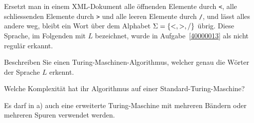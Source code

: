 Ersetzt man in einem XML-Dokument alle öffnenden Elemente durch {\tt <},
alle schliessenden Elemente durch {\tt >} und alle leeren Elemente
durch {\tt /}, und lässt alles andere weg, bleibt ein Wort über
dem Alphabet $\Sigma =\{{\tt <},{\tt >},{\tt /}\}$ übrig.
Diese Sprache, im Folgenden mit $L$ bezeichnet, wurde in Aufgabe~\ref{40000013}
als nicht regulär erkannt.
\begin{teilaufgaben}
\item
Beschreiben Sie einen Turing-Maschinen-Algorithmus, welcher genau die
Wörter der Sprache $L$ erkennt.
\item
Welche Komplexität hat ihr Algorithmus auf einer Standard-Turing-Maschine?
\end{teilaufgaben}

\begin{hinweis}
Es darf in a) auch eine erweiterte Turing-Maschine
mit mehreren Bändern oder mehreren Spuren verwendet werden.
\end{hinweis}


